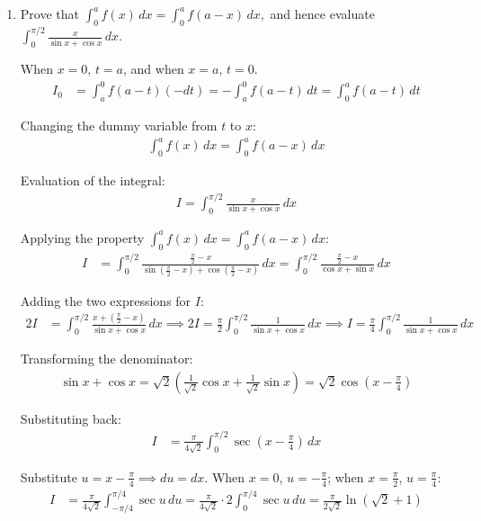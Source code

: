 \begin{enumerate}[label=\thesubsection.\arabic*, ref=\thesubsection.\theenumi]
\item Prove that $\int_0^a f(x)\,dx=\int_0^a f(a-x)\,dx,$ and hence evaluate $\int_0^{\pi/2}\frac{x}{\sin x+\cos x}\,dx.$

\solution
When $x = 0$, $t = a$, and when $x = a$, $t = 0$.
\begin{align*}
	I_0 &= \int_a^0 f(a - t)(-dt) = -\int_a^0 f(a - t)\,dt = \int_0^a f(a - t)\,dt
\end{align*}

Changing the dummy variable from $t$ to $x$:
\begin{align*}
	\int_0^a f(x)\,dx = \int_0^a f(a - x)\,dx
\end{align*}

Evaluation of the integral:
\begin{align*}
	I = \int_0^{\pi/2} \frac{x}{\sin x + \cos x}\,dx
\end{align*}

Applying the property $\int_0^a f(x)\,dx = \int_0^a f(a - x)\,dx$:
\begin{align*}
	I &= \int_0^{\pi/2} \frac{\frac{\pi}{2} - x}{\sin\left(\frac{\pi}{2} - x\right) + \cos\left(\frac{\pi}{2} - x\right)}\,dx = \int_0^{\pi/2} \frac{\frac{\pi}{2} - x}{\cos x + \sin x}\,dx
\end{align*}

Adding the two expressions for $I$:
\begin{align*}
	2I &= \int_0^{\pi/2} \frac{x + \left(\frac{\pi}{2} - x\right)}{\sin x + \cos x}\,dx \implies
	2I = \frac{\pi}{2} \int_0^{\pi/2} \frac{1}{\sin x + \cos x}\,dx \implies
	I = \frac{\pi}{4} \int_0^{\pi/2} \frac{1}{\sin x + \cos x}\,dx
\end{align*}

Transforming the denominator:
\begin{align*}
	\sin x + \cos x = \sqrt{2}\left(\frac{1}{\sqrt{2}}\cos x + \frac{1}{\sqrt{2}}\sin x\right) = \sqrt{2}\cos\left(x - \frac{\pi}{4}\right)
\end{align*}

Substituting back:
\begin{align*}
	I &= \frac{\pi}{4\sqrt{2}} \int_0^{\pi/2} \sec\left(x - \frac{\pi}{4}\right)\,dx
\end{align*}

Substitute $u = x - \frac{\pi}{4} \implies du = dx$. When $x = 0$, $u = -\frac{\pi}{4}$; when $x = \frac{\pi}{2}$, $u = \frac{\pi}{4}$:
\begin{align*}
	I &= \frac{\pi}{4\sqrt{2}} \int_{-\pi/4}^{\pi/4} \sec u\,du 
	= \frac{\pi}{4\sqrt{2}} \cdot 2 \int_0^{\pi/4} \sec u\,du 
	= \frac{\pi}{2\sqrt{2}} \ln(\sqrt{2} + 1)
\end{align*}




\end{enumerate}
